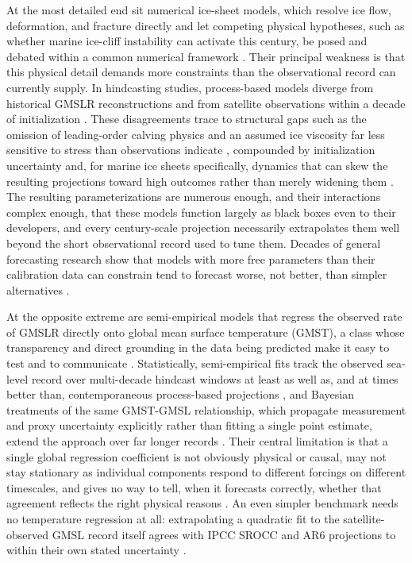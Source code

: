 \documentclass[12pt]{article}
\begin{document}
At the most detailed end sit numerical ice-sheet models, which resolve ice
flow, deformation, and fracture directly and let competing physical
hypotheses, such as whether marine ice-cliff instability can activate this
century, be posed and debated within a common numerical framework
\citep{DeContoP2016,Edwards2019,Morlighem2024}. Their principal weakness
is that this physical detail demands more constraints than the
observational record can currently supply. In hindcasting studies,
process-based models diverge from historical GMSLR reconstructions
\citep{Aschwanden2021} and from satellite observations within a decade of
initialization \citep{Fricker2025}. These disagreements trace to
structural gaps such as the omission of leading-order calving physics
\citep{Fricker2025} and an assumed ice viscosity far less sensitive to
stress than observations indicate \citep{Millstein2022,
GetraerMorlighem2025}, compounded by initialization uncertainty and, for
marine ice sheets specifically, dynamics that can skew the resulting
projections toward high outcomes rather than merely widening them
\citep{Robel2019}. The resulting parameterizations are numerous enough,
and their interactions complex enough, that these models function largely
as black boxes even to their developers, and every century-scale
projection necessarily extrapolates them well beyond the short
observational record used to tune them. Decades of general forecasting
research show that
models with more free parameters than their calibration data can
constrain tend to forecast worse, not better, than simpler alternatives
\citep{Green2015}.

At the opposite extreme are semi-empirical models that regress the
observed rate of GMSLR directly onto global mean surface temperature
(GMST), a class whose transparency and direct grounding in the data being
predicted make it easy to test and to communicate \citep{Rahmstorf2007,
Vermeer2009}. Statistically, semi-empirical fits track the observed
sea-level record over multi-decade hindcast windows at least as well as,
and at times better than, contemporaneous process-based projections
\citep{Rahmstorf2012}, and
Bayesian treatments of the same GMST-GMSL relationship, which propagate
measurement and proxy uncertainty explicitly rather than fitting a single
point estimate, extend the approach over far longer records
\citep{Kopp2016}. Their central limitation is that a single global
regression coefficient is not obviously physical or causal, may not stay
stationary as individual components respond to different forcings on
different timescales, and gives no way to tell, when it forecasts
correctly, whether that agreement reflects the right physical reasons
\citep{Church2013}. An even simpler benchmark needs no temperature
regression at all: extrapolating a quadratic fit to the
satellite-observed GMSL record itself agrees with IPCC SROCC and AR6
projections to within their own stated uncertainty \citep{Nerem2022}.
\end{document}
